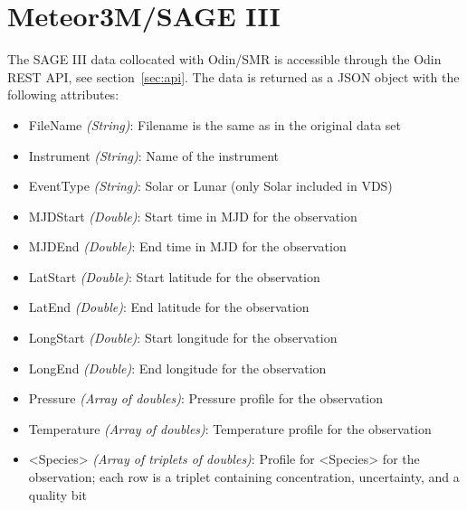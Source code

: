 \section{Meteor3M/SAGE III}
The SAGE III data collocated with Odin/SMR is accessible through the Odin REST
API, see section~\ref{sec:api}. The data is returned as a JSON object with the
following attributes:
\begin{itemize}
    \item FileName    \emph{(String)}: Filename is the same as in the original
        data set
    \item Instrument  \emph{(String)}: Name of the instrument
    \item EventType   \emph{(String)}: Solar or Lunar (only Solar included in
        VDS)
    \item MJDStart    \emph{(Double)}: Start time in MJD for the observation
    \item MJDEnd      \emph{(Double)}: End time in MJD for the observation
    \item LatStart    \emph{(Double)}: Start latitude for the observation
    \item LatEnd      \emph{(Double)}: End latitude for the observation
    \item LongStart   \emph{(Double)}: Start longitude for the observation
    \item LongEnd     \emph{(Double)}: End longitude for the observation
    \item Pressure    \emph{(Array of doubles)}: Pressure profile for the
        observation
    \item Temperature \emph{(Array of doubles)}: Temperature profile for the
        observation
    \item <Species>   \emph{(Array of triplets of doubles)}: Profile for
        <Species> for the observation; each row is a triplet containing
        concentration, uncertainty, and a quality bit
\end{itemize}


